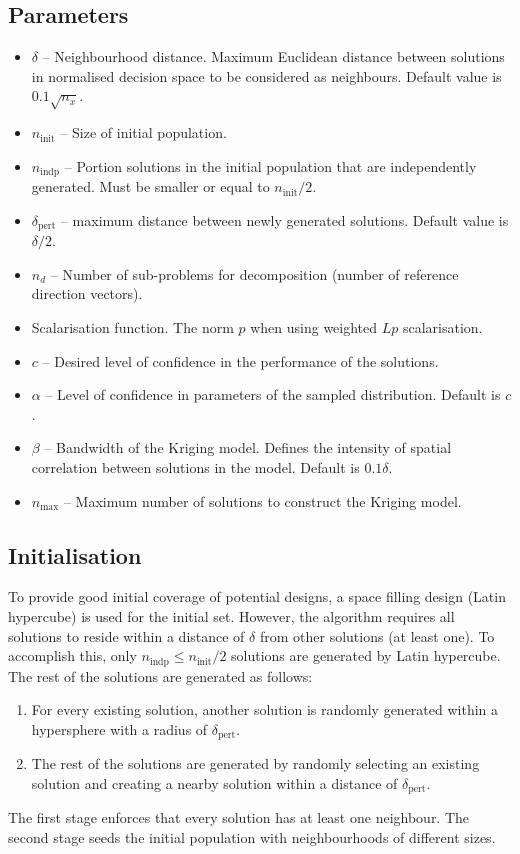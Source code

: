 \documentclass[10pt]{llncs}
\begin{document}
\subsection{Parameters}
\begin{itemize}
\item $\delta$ -- Neighbourhood distance.
Maximum Euclidean distance between solutions in normalised decision space to be considered as neighbours.
Default value is $0.1 \sqrt{n_x}$.
\item $n_\text{init}$ -- Size of initial population.
\item $n_\text{indp}$ -- Portion solutions in the initial population that are independently generated.
Must be smaller or equal to $n_\text{init}/2$.
\item $\delta_\text{pert}$ -- maximum distance between newly generated solutions.
Default value is $\delta / 2$.
\item $n_d$ -- Number of sub-problems for decomposition (number of reference direction vectors).
\item Scalarisation function. The norm $p$ when using weighted $Lp$ scalarisation.
\item $c$ -- Desired level of confidence in the performance of the solutions.
\item $\alpha$ -- Level of confidence in parameters of the sampled distribution. Default is $c$.
\item $\beta$ -- Bandwidth of the Kriging model. Defines the intensity of spatial correlation between solutions in the model. Default is $0.1 \delta$.
\item $n_\text{max}$ -- Maximum number of solutions to construct the Kriging model.
\end{itemize}

\subsection{Initialisation}
To provide good initial coverage of potential designs, a space filling design (Latin hypercube) is used for the initial set.
However, the algorithm requires all solutions to reside within a distance of $\delta$ from other solutions (at least one).
To accomplish this, only $n_\text{indp} \leq n_\text{init}/2$ solutions are generated by Latin hypercube.
The rest of the solutions are generated as follows:
\begin{enumerate}
\item For every existing solution, another solution is randomly generated within a hypersphere with a radius of $\delta_\text{pert}$.
\item The rest of the solutions are generated by randomly selecting an existing solution and creating a nearby solution within a distance of $\delta_\text{pert}$.
\end{enumerate}
The first stage enforces that every solution has at least one neighbour.
The second stage seeds the initial population with neighbourhoods of different sizes.
\end{document}
